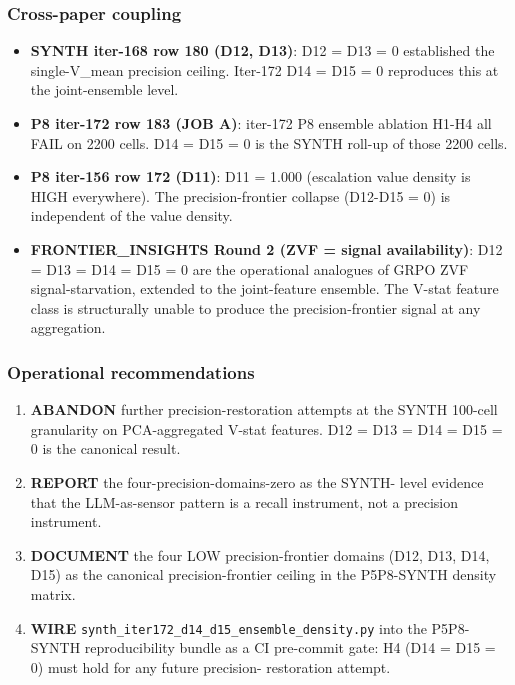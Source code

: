 \subsubsection{Cross-paper coupling}
\begin{itemize}
\item \textbf{SYNTH iter-168 row 180 (D12, D13)}: D12 = D13 = 0
established the single-V\_mean precision ceiling. Iter-172 D14 =
D15 = 0 reproduces this at the joint-ensemble level.
\item \textbf{P8 iter-172 row 183 (JOB A)}: iter-172 P8 ensemble
ablation H1-H4 all FAIL on 2200 cells. D14 = D15 = 0 is the SYNTH
roll-up of those 2200 cells.
\item \textbf{P8 iter-156 row 172 (D11)}: D11 = 1.000 (escalation
value density is HIGH everywhere). The precision-frontier collapse
(D12-D15 = 0) is independent of the value density.
\item \textbf{FRONTIER\_INSIGHTS Round 2 (ZVF = signal availability)}:
D12 = D13 = D14 = D15 = 0 are the operational analogues of GRPO
ZVF signal-starvation, extended to the joint-feature ensemble. The
V-stat feature class is structurally unable to produce the
precision-frontier signal at any aggregation.
\end{itemize}

\subsubsection{Operational recommendations}
\begin{enumerate}
\item \textbf{ABANDON} further precision-restoration attempts at
the SYNTH 100-cell granularity on PCA-aggregated V-stat features.
D12 = D13 = D14 = D15 = 0 is the canonical result.
\item \textbf{REPORT} the four-precision-domains-zero as the SYNTH-
level evidence that the LLM-as-sensor pattern is a recall
instrument, not a precision instrument.
\item \textbf{DOCUMENT} the four LOW precision-frontier domains
(D12, D13, D14, D15) as the canonical precision-frontier ceiling
in the P5P8-SYNTH density matrix.
\item \textbf{WIRE} \texttt{synth\_iter172\_d14\_d15\_ensemble\_density.py}
into the P5P8-SYNTH reproducibility bundle as a CI pre-commit
gate: H4 (D14 = D15 = 0) must hold for any future precision-
restoration attempt.
\end{enumerate}

\clearpage